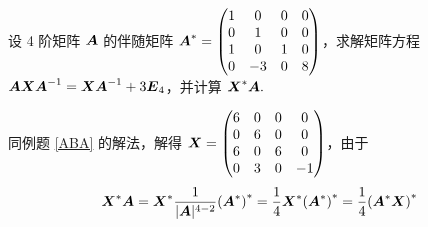 \begin{example}
    设 4 阶矩阵 $\vb*{A}$ 的伴随矩阵 $\vb*{A}^*=\begin{pmatrix}
            1 & 0  & 0 & 0 \\
            0 & 1  & 0 & 0 \\
            1 & 0  & 1 & 0 \\
            0 & -3 & 0 & 8
        \end{pmatrix}$，求解矩阵方程 $\vb*{AXA}^{-1}=\vb*{XA}^{-1}+3\vb*{E}_4$，并计算 $\vb*{X}^*\vb*{A}.$
\end{example}
\begin{solution}
    同例题 \ref{ABA} 的解法，解得 $\vb*{X}=\begin{pmatrix}
            6 & 0 & 0 & 0  \\
            0 & 6 & 0 & 0  \\
            6 & 0 & 6 & 0  \\
            0 & 3 & 0 & -1
        \end{pmatrix}$，由于 $$\vb*{X}^*\vb*{A}=\vb*{X}^*\dfrac{1}{|\vb*{A}|^{4-2}}\qty(\vb*{A}^*)^*=\dfrac{1}{4}\vb*{X}^*\qty(\vb*{A}^*)^*=\dfrac{1}{4}\qty(\vb*{A}^*\vb*{X})^*$$
\end{solution}
